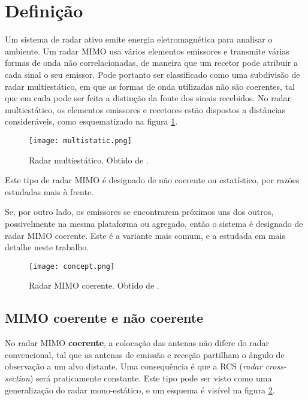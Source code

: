 \documentclass[purist,portuguese]{ist-report}
\begin{document}
\section{Definição}

Um sistema de radar ativo emite energia eletromagnética para analisar o ambiente.
Um radar MIMO usa vários elementos emissores e transmite várias formas de onda não correlacionadas, de maneira que um recetor pode atribuir a cada sinal o seu emissor. 
Pode portanto ser classificado como uma subdivisão de radar multiestático, em que as formas de onda utilizadas não são coerentes, tal que em cada pode ser feita a distinção da fonte dos sinais recebidos.
No radar multiestático, os elementos emissores e recetores estão dispostos a distâncias consideráveis, como esquematizado na figura \ref{fig:multi}.

\begin{figure}[h]
  \centering
  \texttt{[image: multistatic.png]}
  \caption{Radar multiestático. Obtido de \cite{mimoradarbook}.}
  \label{fig:multi}
\end{figure}

Este tipo de radar MIMO é designado de não coerente ou estatístico, por razões estudadas mais à frente.

Se, por outro lado, os emissores se encontrarem próximos uns dos outros, possivelmente na mesma plataforma ou agregado, então o sistema é designado de radar MIMO coerente.
Este é a variante mais comum, e a estudada em mais detalhe neste trabalho.

\begin{figure}[h]
  \centering
  \texttt{[image: concept.png]}
  \caption{Radar MIMO coerente. Obtido de \cite{mimoradarbook}.}
  \label{fig:concept}
\end{figure}

\subsection{MIMO coerente e não coerente}

No radar MIMO \textbf{coerente}, a colocação das antenas não difere do radar convencional, tal que as antenas de emissão e receção partilham o ângulo de observação a um alvo distante.
Uma consequência é que a RCS (\textit{radar cross-section}) será praticamente constante.
Este tipo pode ser visto como uma generalização do radar mono-estático, e um esquema é visível na figura \ref{fig:concept}.
\end{document}
